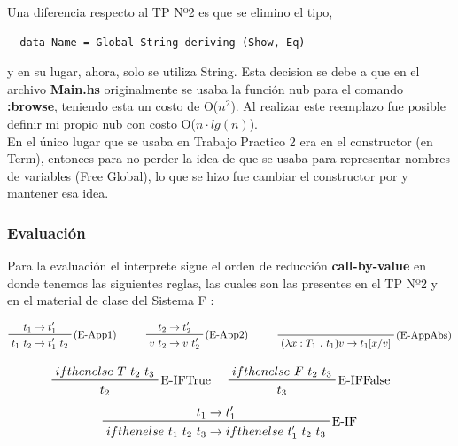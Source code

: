 \documentclass[12pt, titlepage, a4paper]{article}
\begin{document}
\noindent Una diferencia respecto al TP Nº2 \cite{tp2:lambdaCalculoSimpleTipado} es que se elimino el tipo,
\begin{verbatim}
  data Name = Global String deriving (Show, Eq)  
\end{verbatim}
y en su lugar, ahora, solo se utiliza String. Esta decision se debe a que en el archivo \textbf{Main.hs} originalmente se usaba la función 
nub para el comando \textbf{:browse}, teniendo esta un costo de O($n^2$). Al realizar este reemplazo fue posible definir mi propio nub 
con costo O($n\cdot lg(n)$). \\

En el único lugar que se usaba  en Trabajo Practico 2 era en el constructor  (en Term), 
entonces para no perder la idea de que  se usaba para 
representar nombres de variables  (Free Global), lo que se hizo fue cambiar el constructor  por 
 y mantener esa idea. 

\subsubsection{Evaluación}
Para la evaluación el interprete sigue el orden de reducción \textbf{call-by-value} en donde tenemos las siguientes reglas, las cuales 
son las presentes en el TP Nº2 \cite{tp2:lambdaCalculoSimpleTipado} y en el material de clase del Sistema F \cite{ALP:Polimorfismo}:

\begin{displaymath}
    \prftree[r]{(E-App1)}{t_1 \rightarrow t_1'}{t_1 \ t_2 \rightarrow t_1' \ t_2}  \hspace{1cm}
    \prftree[r]{(E-App2)}{t_2 \rightarrow t_2'}{v \ t_2 \rightarrow v \ t_2'}  \hspace{1cm}
    \prftree[r]{(E-AppAbs)}{}{(\lambda x : T_1 \ . \ t_1 ) v \rightarrow t_1[x/v]}
\end{displaymath}

\begin{displaymath}
    \prftree[r]{E-IFTrue}{ifthenelse \ T \ t_2 \ t_3}{t_2} \hspace{0.5cm}
    \prftree[r]{E-IFFalse}{ifthenelse \ F \ t_2 \ t_3}{t_3} \hspace{0.5cm}
\end{displaymath}
\begin{displaymath}
    \prftree[r]{E-IF}{t_1 \rightarrow t_1'}{ifthenelse \ t_1 \ t_2 \ t_3 \rightarrow ifthenelse \ t_1' \ t_2 \ t_3}
\end{displaymath}
\end{document}
